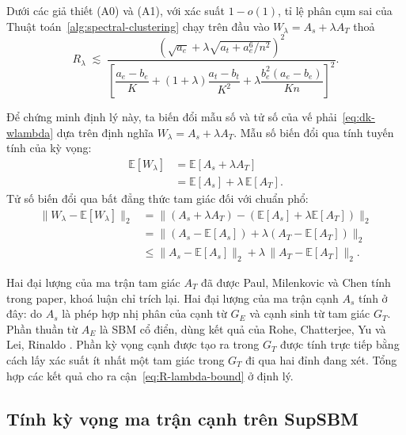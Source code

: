 \begin{theorem}
\label{thm:misclustering-rate}
Dưới các giả thiết \textnormal{(A0)} và \textnormal{(A1)}, với xác suất $1 - o(1)$, tỉ lệ phân cụm sai của Thuật toán~\ref{alg:spectral-clustering} chạy trên đầu vào $W_\lambda = A_s + \lambda A_T$ thoả
\begin{equation}
\label{eq:R-lambda-bound}
    R_\lambda \;\lesssim\; \frac{\left(\sqrt{a_e} + \lambda \sqrt{a_t + a_e^6/n^2}\right)^2}{\left[\dfrac{a_e - b_e}{K} + (1 + \lambda) \dfrac{a_t - b_t}{K^2} + \lambda \dfrac{b_e^2 (a_e - b_e)}{K n}\right]^2}.
\end{equation}
\end{theorem}

Để chứng minh định lý này, ta biến đổi mẫu số và tử số của vế phải~\eqref{eq:dk-wlambda} dựa trên định nghĩa $W_\lambda = A_s + \lambda A_T$. Mẫu số biến đổi qua tính tuyến tính của kỳ vọng:
\begin{align*}
    \mathbb{E}[W_\lambda]
        &= \mathbb{E}[A_s + \lambda A_T] \\
        &= \mathbb{E}[A_s] + \lambda \, \mathbb{E}[A_T].
\end{align*}
Tử số biến đổi qua bất đẳng thức tam giác đối với chuẩn phổ:
\begin{align*}
    \|W_\lambda - \mathbb{E}[W_\lambda]\|_2
        &= \|(A_s + \lambda A_T) - (\mathbb{E}[A_s] + \lambda \mathbb{E}[A_T])\|_2 \\
        &= \|(A_s - \mathbb{E}[A_s]) + \lambda (A_T - \mathbb{E}[A_T])\|_2 \\
        &\leq \|A_s - \mathbb{E}[A_s]\|_2 + \lambda \, \|A_T - \mathbb{E}[A_T]\|_2.
\end{align*}

Hai đại lượng của ma trận tam giác $A_T$ đã được Paul, Milenkovic và Chen \cite{paul2023hosc} tính trong paper, khoá luận chỉ trích lại. Hai đại lượng của ma trận cạnh $A_s$ tính ở đây: do $A_s$ là phép hợp nhị phân của cạnh từ $G_E$ và cạnh sinh từ tam giác $G_T$. Phần thuần từ $A_E$ là SBM cổ điển, dùng kết quả của Rohe, Chatterjee, Yu \cite{rohe2011} và Lei, Rinaldo \cite{lei2015}. Phần kỳ vọng cạnh được tạo ra trong $G_T$ được tính trực tiếp bằng cách lấy xác suất ít nhất một tam giác trong $G_T$ đi qua hai đỉnh đang xét. Tổng hợp các kết quả cho ra cận~\eqref{eq:R-lambda-bound} ở định lý.

\subsection{Tính kỳ vọng ma trận cạnh trên SupSBM}
\label{subsec:expectation-edge}

